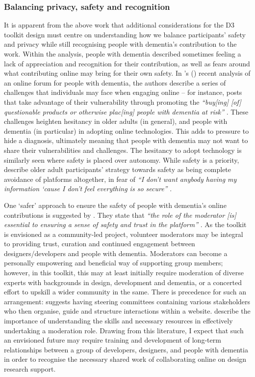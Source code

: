 \subsubsection{Balancing privacy, safety and recognition}
It is apparent from the above work that additional considerations for the D3 toolkit design must centre on understanding how we balance participants’ safety and privacy while still recognising people with dementia's contribution to the work. Within the analysis, people with dementia described sometimes feeling a lack of appreciation and recognition for their contribution, as well as fears around what contributing online may bring for their own safety. In \citeauthor{johnson2020roles}'s (\citeyear{johnson2020roles}) recent analysis of an online forum for people with dementia, the authors describe a series of challenges that individuals may face when engaging online – for instance, posts that take advantage of their vulnerability through promoting the \textit{``buy[ing] [of] questionable products or otherwise plac[ing] people with dementia at risk''} \citep[pg.127]{johnson2020roles}. These challenges heighten hesitancy in older adults (in general), and people with dementia (in particular) in adopting online technologies. This adds to pressure to hide a diagnosis, ultimately meaning that people with dementia may not want to share their vulnerabilities and challenges. The hesitancy to adopt technology is similarly seen where safety is placed over autonomy. While safety is a priority, \cite{quan2020online} describe older adult participants’ strategy towards safety as being complete avoidance of platforms altogether, in fear of \textit{``I don’t want anybody having my information ‘cause I don’t feel everything is so secure'' } \citep[p.1095]{quan2020online}.

One ‘safer’ approach to ensure the safety of people with dementia’s online contributions is suggested by \cite{lazar_safe_2019}. They state that \textit{``the role of the moderator [is] essential to ensuring a sense of safety and trust in the platform''  }\citep[p.85:9]{lazar_safe_2019}. As the toolkit is envisioned as a community-led project, volunteer moderators may be integral to providing trust, curation and continued engagement between designers/developers and people with dementia. Moderators can become a personally empowering and beneficial way of supporting group members; however, in this toolkit, this may at least initially require moderation of diverse experts with backgrounds in design, development and dementia, or a concerted effort to upskill a wider community in the same. There is precedence for such an arrangement: \cite{kendall2008collaborative} suggests having steering committees containing various stakeholders who then organise, guide and structure interactions within a website. \cite{coulson2013nurturing} describe the importance of understanding the skills and necessary resources in effectively undertaking a moderation role. Drawing from this literature, I expect that such an envisioned future may require training and development of long-term relationships between a group of developers, designers, and people with dementia in order to recognise the necessary shared work of collaborating online on design research support.

